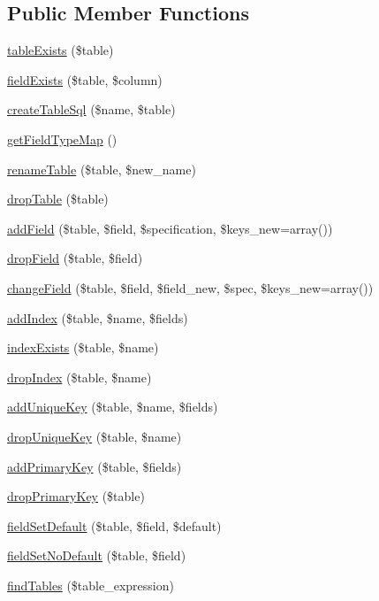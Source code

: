 \subsection*{Public Member Functions}
\begin{DoxyCompactItemize}
\item 
\hyperlink{classDatabaseSchema__sqlite_a8799172b7c34295d232f0335af6ddc08}{tableExists} (\$table)
\item 
\hyperlink{classDatabaseSchema__sqlite_a0ed3e65a49d4d1fc0db835ed5e49bf45}{fieldExists} (\$table, \$column)
\item 
\hyperlink{classDatabaseSchema__sqlite_a785f6c8f33c27551e0e590613bcd49c7}{createTableSql} (\$name, \$table)
\item 
\hyperlink{classDatabaseSchema__sqlite_a0acdc6880132e45933c71928ca9d0ea7}{getFieldTypeMap} ()
\item 
\hyperlink{classDatabaseSchema__sqlite_a3ca3d490665805d43e6c143b90de0cf9}{renameTable} (\$table, \$new\_\-name)
\item 
\hyperlink{classDatabaseSchema__sqlite_adfb4c367167a77d523c3d002af1fc7cc}{dropTable} (\$table)
\item 
\hyperlink{classDatabaseSchema__sqlite_ae55ed07d32dcc323c699b490e0dc137b}{addField} (\$table, \$field, \$specification, \$keys\_\-new=array())
\item 
\hyperlink{classDatabaseSchema__sqlite_a724d96040dfa30f34e5f0278525774bf}{dropField} (\$table, \$field)
\item 
\hyperlink{classDatabaseSchema__sqlite_ada4db729f33e2ac55a9d886f30b7b3ad}{changeField} (\$table, \$field, \$field\_\-new, \$spec, \$keys\_\-new=array())
\item 
\hyperlink{classDatabaseSchema__sqlite_af6c71cb38c8cf5b8e37fe00d9c32861c}{addIndex} (\$table, \$name, \$fields)
\item 
\hyperlink{classDatabaseSchema__sqlite_ac3f44b37b0b2d08a47433b5b4120aa6b}{indexExists} (\$table, \$name)
\item 
\hyperlink{classDatabaseSchema__sqlite_a876b9d643b03532cf0be81f6ea13ad9f}{dropIndex} (\$table, \$name)
\item 
\hyperlink{classDatabaseSchema__sqlite_ad180a50d157cd3488cf81f8cc08dd80f}{addUniqueKey} (\$table, \$name, \$fields)
\item 
\hyperlink{classDatabaseSchema__sqlite_a93c409d48623019e1a5c1a2ff881c2c7}{dropUniqueKey} (\$table, \$name)
\item 
\hyperlink{classDatabaseSchema__sqlite_a00b3d8c7ebad2d9ca71d41e3caab7624}{addPrimaryKey} (\$table, \$fields)
\item 
\hyperlink{classDatabaseSchema__sqlite_a2fe8b467c14e7fca2f24b2af6487db4c}{dropPrimaryKey} (\$table)
\item 
\hyperlink{classDatabaseSchema__sqlite_a357cd81ce4c000c77592cdcea4bc8d06}{fieldSetDefault} (\$table, \$field, \$default)
\item 
\hyperlink{classDatabaseSchema__sqlite_a607aa7b0fef26ab3dfd08d46103ad4ce}{fieldSetNoDefault} (\$table, \$field)
\item 
\hyperlink{classDatabaseSchema__sqlite_a7cfb91db091c6f998be9d660ea5c63ae}{findTables} (\$table\_\-expression)
\end{DoxyCompactItemize}
